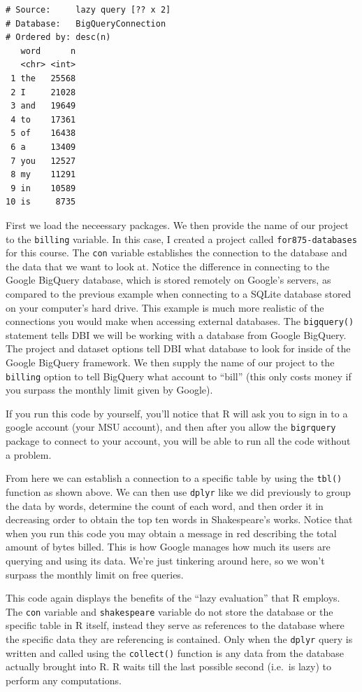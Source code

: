 \documentclass[]{krantz}
\begin{document}
\begin{verbatim}
# Source:     lazy query [?? x 2]
# Database:   BigQueryConnection
# Ordered by: desc(n)
   word      n
   <chr> <int>
 1 the   25568
 2 I     21028
 3 and   19649
 4 to    17361
 5 of    16438
 6 a     13409
 7 you   12527
 8 my    11291
 9 in    10589
10 is     8735
\end{verbatim}

First we load the neceessary packages. We then provide the name of our
project to the \texttt{billing} variable. In this case, I created a
project called \texttt{for875-databases} for this course. The
\texttt{con} variable establishes the connection to the database and the
data that we want to look at. Notice the difference in connecting to the
Google BigQuery database, which is stored remotely on Google's servers,
as compared to the previous example when connecting to a SQLite database
stored on your computer's hard drive. This example is much more
realistic of the connections you would make when accessing external
databases. The \texttt{bigquery()} statement tells DBI we will be
working with a database from Google BigQuery. The project and dataset
options tell DBI what database to look for inside of the Google BigQuery
framework. We then supply the name of our project to the
\texttt{billing} option to tell BigQuery what account to ``bill'' (this
only costs money if you surpass the monthly limit given by Google).

If you run this code by yourself, you'll notice that R will ask you to
sign in to a google account (your MSU account), and then after you allow
the \texttt{bigrquery} package to connect to your account, you will be
able to run all the code without a problem.

From here we can establish a connection to a specific table by using the
\texttt{tbl()} function as shown above. We can then use \texttt{dplyr}
like we did previously to group the data by words, determine the count
of each word, and then order it in decreasing order to obtain the top
ten words in Shakespeare's works. Notice that when you run this code you
may obtain a message in red describing the total amount of bytes billed.
This is how Google manages how much its users are querying and using its
data. We're just tinkering around here, so we won't surpass the monthly
limit on free queries.

This code again displays the benefits of the ``lazy evaluation'' that R
employs. The \texttt{con} variable and \texttt{shakespeare} variable do
not store the database or the specific table in R itself, instead they
serve as references to the database where the specific data they are
referencing is contained. Only when the \texttt{dplyr} query is written
and called using the \texttt{collect()} function is any data from the
database actually brought into R. R waits till the last possible second
(i.e.~is lazy) to perform any computations.
\end{document}
